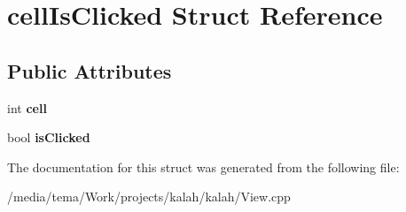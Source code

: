 \hypertarget{structcell_is_clicked}{}\section{cell\+Is\+Clicked Struct Reference}
\label{structcell_is_clicked}
\subsection*{Public Attributes}
\begin{DoxyCompactItemize}
\item 
int {\bfseries cell}\hypertarget{structcell_is_clicked_aaace1e561f580d72710a2af2e796e80a}{}\label{structcell_is_clicked_aaace1e561f580d72710a2af2e796e80a}

\item 
bool {\bfseries is\+Clicked}\hypertarget{structcell_is_clicked_a944fb236f69072cbbb8497b83d068904}{}\label{structcell_is_clicked_a944fb236f69072cbbb8497b83d068904}

\end{DoxyCompactItemize}


The documentation for this struct was generated from the following file\+:\begin{DoxyCompactItemize}
\item 
/media/tema/\+Work/projects/kalah/kalah/View.\+cpp\end{DoxyCompactItemize}
